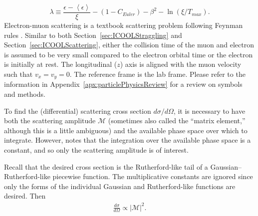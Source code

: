 \begin{equation}\label{eqn:landauParameter}
\lambda \equiv \frac{\epsilon-\left<\epsilon\right>}{\xi}-(1-C_{Euler})-\beta ^2 -\ln (\xi/T_{max}).
\end{equation}
\label{apx:cosy_cross_section}
 Electron-muon scattering is a textbook scattering problem following Feynman rules \cite{griffithspp}. Similar to both Section~\ref{sec:ICOOLStraggling} and Section~\ref{sec:ICOOLScattering}, either the collision time of the muon and electron is assumed to be very small compared to the electron orbital time or the electron is initially at rest. The longitudinal ($z$) axis is aligned with the muon velocity such that $v_x=v_y=0$. The reference frame is the lab frame. Please refer to the information in Appendix~\ref{apx:particlePhysicsReview} for a review on symbols and methods.

To find the (differential) scattering cross section $d\sigma/d\Omega$, it is necessary to have both the scattering amplitude $\mathcal{M}$ (sometimes also called the ``matrix element,'' although this is a little ambiguous) and the available phase space over which to integrate. However, \cite{griffithspp} notes that the integration over the available phase space is a constant, and so only the scattering amplitude is of interest.

Recall that the desired cross section is the Rutherford-like tail of a Gaussian--Rutherford-like piecewise function. The multiplicative constants are ignored since only the forms of the individual Gaussian and Rutherford-like functions are desired. Then
\begin{align*}
\frac{d\sigma}{d\Omega}\propto |\mathcal{M}|^2.
\end{align*}

